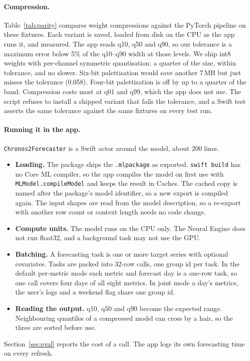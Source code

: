\documentclass[11pt,a4paper]{article}
\begin{document}
\paragraph{Compression.} Table~\ref{tab:parity} compares weight compressions against the PyTorch pipeline on these fixtures. Each variant is saved, loaded from disk on the CPU as the app runs it, and measured. The app reads q10, q50 and q90, so our tolerance is a maximum error below 5\% of the q10--q90 width at those levels. We ship int8 weights with per-channel symmetric quantisation: a quarter of the size, within tolerance, and no slower. Six-bit palettisation would save another 7\,MB but just misses the tolerance (0.058). Four-bit palettisation is off by up to a quarter of the band. Compression costs most at q01 and q99, which the app does not use. The script refuses to install a shipped variant that fails the tolerance, and a Swift test asserts the same tolerance against the same fixtures on every test run.


\paragraph{Running it in the app.} \texttt{Chronos2Forecaster} is a Swift actor around the model, about 200 lines.
\begin{itemize}
  \item \textbf{Loading.} The package ships the \texttt{.mlpackage} as exported. \texttt{swift build} has no Core ML compiler, so the app compiles the model on first use with \texttt{MLModel.compileModel} and keeps the result in Caches. The cached copy is named after the package's model identifier, so a new export is compiled again. The input shapes are read from the model description, so a re-export with another row count or context length needs no code change.
  \item \textbf{Compute units.} The model runs on the CPU only. The Neural Engine does not run float32, and a background task may not use the GPU.
  \item \textbf{Batching.} A forecasting task is one or more target series with optional covariates. Tasks are packed into 32-row calls, one group id per task. In the default per-metric mode each metric and forecast day is a one-row task, so one call covers four days of all eight metrics. In joint mode a day's metrics, the user's logs and a weekend flag share one group id.
  \item \textbf{Reading the output.} q10, q50 and q90 become the expected range. Neighbouring quantiles of a compressed model can cross by a hair, so the three are sorted before use.
\end{itemize}
Section~\ref{sec:eval} reports the cost of a call. The app logs its own forecasting time on every refresh.
\end{document}
